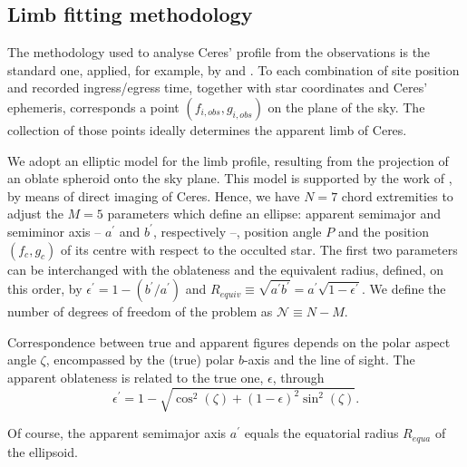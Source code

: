 \documentclass[useAMS,usenatbib]{mn2e}
\begin{document}
\subsection{Limb fitting methodology}

The methodology used to analyse Ceres' profile from the observations is the standard one, applied, for example, by \cite{Ortiz2012} and \cite{BragaRibas2013}. To each combination of site position and recorded ingress/egress time, together with star coordinates and Ceres' ephemeris, corresponds a point $(f_{i,obs},g_{i,obs})$ on the plane of the sky. The collection of those points ideally determines the apparent limb of Ceres.

We adopt an elliptic model for the limb profile, resulting from the projection of an oblate spheroid onto the sky plane. This model is supported by the work of \cite{Drummond2014}, by means of direct imaging of Ceres. Hence, we have $N=7$ chord extremities to adjust the $M=5$ parameters which define an ellipse: apparent semimajor and semiminor axis -- $a^\prime$ and $b^\prime$, respectively --, position angle $P$ and the position $(f_c,g_c)$ of its centre with respect to the occulted star. The first two parameters can be interchanged with the oblateness and the equivalent radius, defined, on this order, by $\epsilon^\prime = 1 - (b^\prime/a^\prime)$ and $R_{equiv} \equiv \sqrt{a^\prime b^\prime} = a^\prime\sqrt{1-\epsilon^\prime}$. We define the number of degrees of freedom of the problem as $\mathcal{N} \equiv N - M$.

Correspondence between true and apparent figures depends on the polar aspect angle $\zeta$, encompassed by the (true) polar $b$-axis and the line of sight. The apparent oblateness is related to the true one, $\epsilon$, through
%
\begin{equation}
\epsilon^\prime = 1 - \sqrt{\cos^2(\zeta) + (1-\epsilon)^2\sin^2(\zeta)}.
\end{equation}

Of course, the apparent semimajor axis $a^\prime$ equals the equatorial radius $R_{equa}$ of the ellipsoid. %
\end{document}
